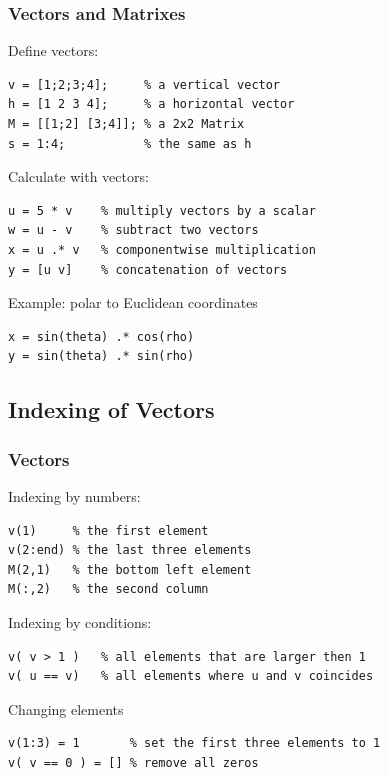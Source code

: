 \documentclass{beamer}
\begin{document}
\begin{frame}[fragile]
  \frametitle{Vectors and Matrixes}
  
Define vectors:

\begin{lstlisting}
v = [1;2;3;4];     % a vertical vector
h = [1 2 3 4];     % a horizontal vector
M = [[1;2] [3;4]]; % a 2x2 Matrix
s = 1:4;           % the same as h
\end{lstlisting}

Calculate with vectors:
\begin{lstlisting}
u = 5 * v    % multiply vectors by a scalar
w = u - v    % subtract two vectors
x = u .* v   % componentwise multiplication
y = [u v]    % concatenation of vectors
\end{lstlisting}

Example: polar to Euclidean coordinates
\begin{lstlisting}
x = sin(theta) .* cos(rho)
y = sin(theta) .* sin(rho)
\end{lstlisting}

\end{frame}

\subsection{Indexing of Vectors}

\begin{frame}[fragile]
  \frametitle{Vectors}


Indexing by numbers:

\begin{lstlisting}
v(1)     % the first element
v(2:end) % the last three elements
M(2,1)   % the bottom left element
M(:,2)   % the second column
\end{lstlisting}

Indexing by conditions:

\begin{lstlisting}
v( v > 1 )   % all elements that are larger then 1
v( u == v)   % all elements where u and v coincides
\end{lstlisting}

Changing elements

\begin{lstlisting}
v(1:3) = 1       % set the first three elements to 1
v( v == 0 ) = [] % remove all zeros 
\end{lstlisting}
  
\end{frame}
\end{document}
